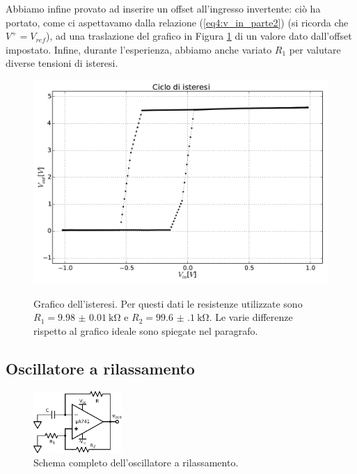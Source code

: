 Abbiamo infine provato ad inserire un offset all'ingresso invertente: ciò ha portato, come ci aspettavamo dalla relazione (\ref{eq4:v_in_parte2}) (si ricorda che $V^+=V_{ref}$), ad una traslazione del grafico in Figura \ref{gr4:isteresi} di un valore dato dall'offset impostato. Infine, durante l'esperienza, abbiamo anche variato $R_1$ per valutare diverse tensioni di isteresi.

\begin{figure}[ht]
 \centering
   {\includegraphics[width=14.5cm]{../E04/latex/XY.pdf}}
 \caption{Grafico dell'isteresi. Per questi dati le resistenze utilizzate sono $R_1=\SI{9.98(1)}{\kohm}$ e $R_2=\SI{99.6(1)}{\kohm}$. Le varie differenze rispetto al grafico ideale sono spiegate nel paragrafo.}
 \label{gr4:isteresi}
\end{figure}

\newpage

\subsection{Oscillatore a rilassamento}

\begin{figure}
  \begin{center}
    \includegraphics[width=0.30\textwidth]{../E04/latex/c_rilassamento.pdf}
  \end{center}
  \caption{Schema completo dell'oscillatore a rilassamento.}
  \label{cir4:oscillatore}
\end{figure}

